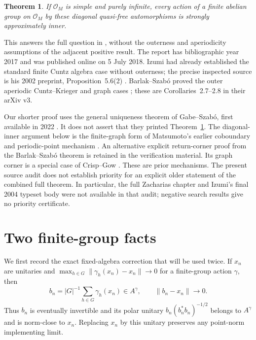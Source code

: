 \documentclass[11pt,a4paper]{article}
\newtheorem{theorem}{Theorem}
\theoremstyle{definition}
\begin{document}
\begin{theorem}\label{thm:ck}
If $\mathcal O_M$ is simple and purely infinite, every action of a finite
abelian group on $\mathcal O_M$ by these diagonal quasi-free automorphisms
is strongly approximately inner.
\end{theorem}

This answers the full question in \cite[p.~2621, Question~1]{OWR}, without
the outerness and aperiodicity assumptions of the adjacent positive
result. The report has bibliographic year 2017 and was published online
on 5 July 2018. Izumi had already established the standard finite Cuntz
algebra case without outerness; the precise inspected source is his
2002 preprint, Proposition~5.6(2) \cite{Izumi}. Barlak--Szab\'o proved the
outer aperiodic Cuntz--Krieger and graph cases
\cite[Theorems~1--2]{BS}; these are Corollaries~2.7--2.8 in their arXiv v3.

Our shorter proof uses the general uniqueness theorem of Gabe--Szab\'o,
first available in 2022 \cite{GS}. It does not assert that they printed
Theorem~\ref{thm:ck}. The diagonal-inner argument below is the finite-graph
form of Matsumoto's earlier coboundary and periodic-point mechanism
\cite[Lemma~5.14 and Proposition~6.4]{Matsumoto}. An alternative explicit
return-corner proof from the Barlak--Szab\'o theorem is retained in the
verification material. Its graph corner is a special case of
Crisp--Gow \cite[Theorem~3.1 in v1]{CG}. These are prior mechanisms.
The present source audit does not establish priority for an explicit
older statement of the combined full theorem. In particular, the full
Zacharias chapter and Izumi's final 2004 typeset body were not available
in that audit; negative search results give no priority certificate.

\section{Two finite-group facts}

We first record the exact fixed-algebra correction that will be used twice.
If $x_n$ are unitaries and
$\max_{h\in G}\|\gamma_h(x_n)-x_n\|\to0$ for a finite-group action
$\gamma$, then
\[
 b_n=|G|^{-1}\sum_{h\in G}\gamma_h(x_n)\in A^\gamma,
 \qquad \|b_n-x_n\|\longrightarrow0.
\]
Thus $b_n$ is eventually invertible and its polar unitary
$b_n(b_n^*b_n)^{-1/2}$ belongs to $A^\gamma$ and is norm-close to $x_n$.
Replacing $x_n$ by this unitary preserves any point-norm implementing limit.
\end{document}
